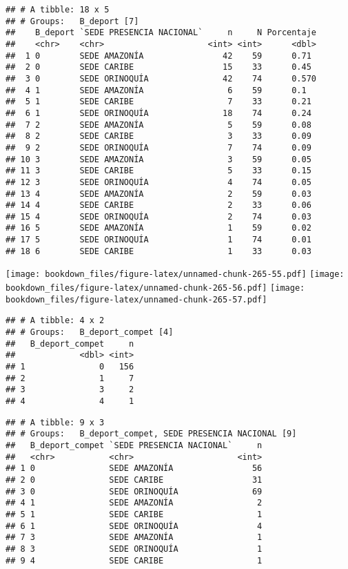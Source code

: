\documentclass[]{article}
\theoremstyle{definition}
\theoremstyle{definition}
\theoremstyle{definition}
\theoremstyle{remark}
\begin{document}
\begin{verbatim}
## # A tibble: 18 x 5
## # Groups:   B_deport [7]
##    B_deport `SEDE PRESENCIA NACIONAL`     n     N Porcentaje
##    <chr>    <chr>                     <int> <int>      <dbl>
##  1 0        SEDE AMAZONÍA                42    59      0.71 
##  2 0        SEDE CARIBE                  15    33      0.45 
##  3 0        SEDE ORINOQUÍA               42    74      0.570
##  4 1        SEDE AMAZONÍA                 6    59      0.1  
##  5 1        SEDE CARIBE                   7    33      0.21 
##  6 1        SEDE ORINOQUÍA               18    74      0.24 
##  7 2        SEDE AMAZONÍA                 5    59      0.08 
##  8 2        SEDE CARIBE                   3    33      0.09 
##  9 2        SEDE ORINOQUÍA                7    74      0.09 
## 10 3        SEDE AMAZONÍA                 3    59      0.05 
## 11 3        SEDE CARIBE                   5    33      0.15 
## 12 3        SEDE ORINOQUÍA                4    74      0.05 
## 13 4        SEDE AMAZONÍA                 2    59      0.03 
## 14 4        SEDE CARIBE                   2    33      0.06 
## 15 4        SEDE ORINOQUÍA                2    74      0.03 
## 16 5        SEDE AMAZONÍA                 1    59      0.02 
## 17 5        SEDE ORINOQUÍA                1    74      0.01 
## 18 6        SEDE CARIBE                   1    33      0.03
\end{verbatim}

\texttt{[image: bookdown\_files/figure-latex/unnamed-chunk-265-55.pdf]}
\texttt{[image: bookdown\_files/figure-latex/unnamed-chunk-265-56.pdf]}
\texttt{[image: bookdown\_files/figure-latex/unnamed-chunk-265-57.pdf]}

\begin{verbatim}
## # A tibble: 4 x 2
## # Groups:   B_deport_compet [4]
##   B_deport_compet     n
##             <dbl> <int>
## 1               0   156
## 2               1     7
## 3               3     2
## 4               4     1
\end{verbatim}

\begin{verbatim}
## # A tibble: 9 x 3
## # Groups:   B_deport_compet, SEDE PRESENCIA NACIONAL [9]
##   B_deport_compet `SEDE PRESENCIA NACIONAL`     n
##   <chr>           <chr>                     <int>
## 1 0               SEDE AMAZONÍA                56
## 2 0               SEDE CARIBE                  31
## 3 0               SEDE ORINOQUÍA               69
## 4 1               SEDE AMAZONÍA                 2
## 5 1               SEDE CARIBE                   1
## 6 1               SEDE ORINOQUÍA                4
## 7 3               SEDE AMAZONÍA                 1
## 8 3               SEDE ORINOQUÍA                1
## 9 4               SEDE CARIBE                   1
\end{verbatim}
\end{document}
